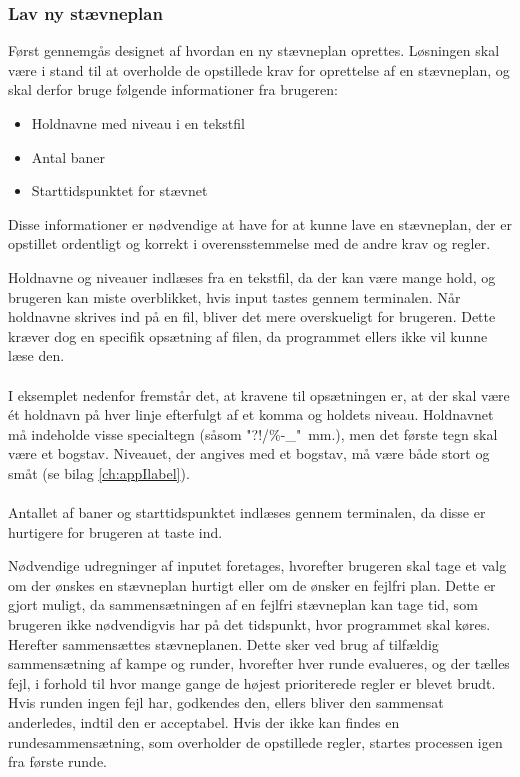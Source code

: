 \subsubsection{Lav ny stævneplan}
Først gennemgås designet af hvordan en ny stævneplan oprettes. Løsningen skal være i stand til at overholde de opstillede krav for oprettelse af en stævneplan, og skal derfor bruge følgende informationer fra brugeren:
\begin{itemize}
    \item Holdnavne med niveau i en tekstfil
    \item Antal baner
    \item Starttidspunktet for stævnet
\end{itemize}
Disse informationer er nødvendige at have for at kunne lave en stævneplan, der er opstillet ordentligt og korrekt i overensstemmelse med de andre krav og regler. 
\par
Holdnavne og niveauer indlæses fra en tekstfil, da der kan være mange hold, og brugeren kan miste overblikket, hvis input tastes gennem terminalen. Når holdnavne skrives ind på en fil, bliver det mere overskueligt for brugeren. Dette kræver dog en specifik opsætning af filen, da programmet ellers ikke vil kunne læse den.
\\\\
I eksemplet nedenfor fremstår det, at kravene til opsætningen er, at der skal være ét holdnavn på hver linje efterfulgt af et komma og holdets niveau. Holdnavnet må indeholde visse specialtegn (såsom "?!/\%-\_"\ mm.), men det første tegn skal være et bogstav. Niveauet, der angives med et bogstav, må være både stort og småt (se bilag \ref{ch:appIlabel}).
\\\\
Antallet af baner og starttidspunktet indlæses gennem terminalen, da disse er hurtigere for brugeren at taste ind.
\par
Nødvendige udregninger af inputet foretages, hvorefter brugeren skal tage et valg om der ønskes en stævneplan hurtigt eller om de ønsker en fejlfri plan. Dette er gjort muligt, da sammensætningen af en fejlfri stævneplan kan tage tid, som brugeren ikke nødvendigvis har på det tidspunkt, hvor programmet skal køres.
Herefter sammensættes stævneplanen. Dette sker ved brug af tilfældig sammensætning af kampe og runder, hvorefter hver runde evalueres, og der tælles fejl, i forhold til hvor mange gange de højest prioriterede regler er blevet brudt. Hvis runden ingen fejl har, godkendes den, ellers bliver den sammensat anderledes, indtil den er acceptabel. Hvis der ikke kan findes en rundesammensætning, som overholder de opstillede regler, startes processen igen fra første runde.
